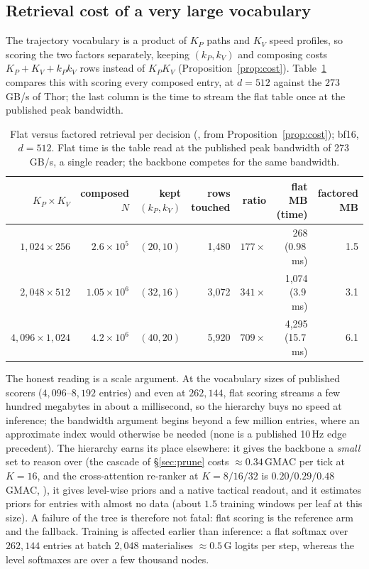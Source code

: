 \subsection{Retrieval cost of a very large vocabulary}
The trajectory vocabulary is a product of $K_P$ paths and $K_V$ speed profiles, so scoring the two factors separately, keeping $(k_P,k_V)$ and composing costs $K_P+K_V+k_Pk_V$ rows instead of $K_PK_V$ (Proposition~\ref{prop:cost}). Table~\ref{tab:cost} compares this with scoring every composed entry, at $d=512$ against the $273$\,GB/s of Thor\evP; the last column is the time to stream the flat table once at the published peak bandwidth.
\begin{table}[h]
\centering\small
\caption{Flat versus factored retrieval per decision (\evE, from Proposition~\ref{prop:cost}); bf16, $d=512$. Flat time is the table read at the published peak bandwidth of 273\,GB/s, a single reader; the backbone competes for the same bandwidth.}
\label{tab:cost}
\begin{tabular}{@{}rrrrrrr@{}}
\toprule
$K_P\times K_V$ & composed $N$ & kept $(k_P,k_V)$ & rows touched & ratio & flat MB (time) & factored MB \\ \midrule
$1{,}024\times256$ & $2.6\times10^{5}$ & $(20,10)$ & 1{,}480 & $177\times$ & 268 (0.98\,ms) & 1.5 \\
$2{,}048\times512$ & $1.05\times10^{6}$ & $(32,16)$ & 3{,}072 & $341\times$ & 1{,}074 (3.9\,ms) & 3.1 \\
$4{,}096\times1{,}024$ & $4.2\times10^{6}$ & $(40,20)$ & 5{,}920 & $709\times$ & 4{,}295 (15.7\,ms) & 6.1 \\
\bottomrule
\end{tabular}
\end{table}
The honest reading is a scale argument. At the vocabulary sizes of published scorers ($4{,}096$--$8{,}192$ entries) and even at $262{,}144$, flat scoring streams a few hundred megabytes in about a millisecond, so the hierarchy buys no speed at inference; the bandwidth argument begins beyond a few million entries, where an approximate index would otherwise be needed (none is a published 10\,Hz edge precedent). The hierarchy earns its place elsewhere: it gives the backbone a \emph{small} set to reason over (the cascade of \S\ref{sec:prune} costs $\approx0.34$\,GMAC per tick at $K=16$, and the cross-attention re-ranker at $K=8/16/32$ is $0.20/0.29/0.48$\,GMAC, \evE), it gives level-wise priors and a native tactical readout, and it estimates priors for entries with almost no data (about $1.5$ training windows per leaf at this size). A failure of the tree is therefore not fatal: flat scoring is the reference arm and the fallback. Training is affected earlier than inference: a flat softmax over $262{,}144$ entries at batch $2{,}048$ materialises $\approx0.5$\,G logits per step, whereas the level softmaxes are over a few thousand nodes.
